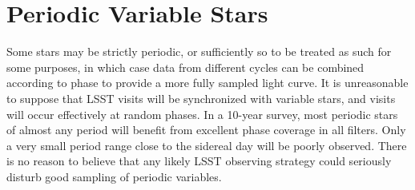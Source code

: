 
%
%
%
%
%
%

\section{Periodic Variable Stars}
\label{sec:keyword} %



Some stars may be strictly periodic, or sufficiently so to be treated as such for some purposes, in which case data from different cycles can be combined according to phase to provide a more fully sampled light curve.  It is unreasonable to suppose that LSST visits will be synchronized with variable stars, and visits will occur effectively at random phases. In a 10-year survey, most periodic stars of almost any period will benefit from  excellent phase coverage in all filters. Only a very small period range close to the sidereal day will be poorly observed.  There is no reason to believe that any likely LSST observing strategy could seriously disturb good sampling of periodic variables.  

